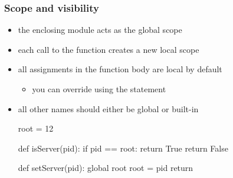 \begin{frame}[fragile]
%
  \frametitle{Scope and visibility}
%
  \begin{itemize}
%
  \item the enclosing module acts as the global scope
  \item each call to the function creates a new local scope
  \item all assignments in the function body are local by default
    \begin{itemize}
    \item you can override using the  statement
    \end{itemize}
  \item all other names should either be global or built-in
%
    \begin{ipython}{}
      root = 12

      def isServer(pid):
          if pid == root: return True
          return False

      def setServer(pid):
          global root
          root = pid
          return
    \end{ipython}
  \end{itemize}
%
\end{frame}

